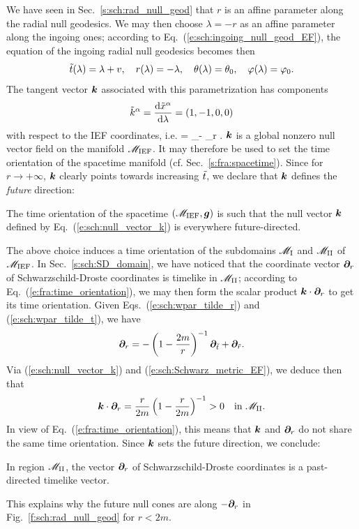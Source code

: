 We have seen in Sec.~\ref{s:sch:rad_null_geod} that $r$ is an affine parameter
along the radial null geodesics. We may then choose $\lambda=-r$ as an
affine parameter along the ingoing ones; according to
Eq.~(\ref{e:sch:ingoing_null_geod_EF}), the equation of the ingoing radial null geodesics
becomes then
\[
    {\tilde t}(\lambda) = \lambda + v, \quad r(\lambda) = - \lambda, \quad
    \theta(\lambda) = \theta_0,\quad \varphi(\lambda) = \varphi_0 .
\]
The tangent vector $\bm{k}$ associated with this parametrization has components
\[
    {\tilde k}^\alpha = \frac{\mathrm{d} {\tilde x}^\alpha}{\mathrm{d} \lambda}
        = (1, -1, 0, 0)
\]
with respect to the IEF coordinates, i.e.
\be \label{e:sch:null_vector_k}
     = \wpar_\ti - \wpar_{\tilde r} .
\ee
$\bm{k}$ is a global nonzero null vector field on the manifold
$\mathscr{M}_{\rm IEF}$. It may therefore be used to set the time orientation of the spacetime manifold
(cf. Sec.~\ref{s:fra:spacetime}). Since for $r\rightarrow+\infty$, $\bm{k}$
clearly points towards increasing ${\tilde t}$, we declare that $\bm{k}$ defines
the \emph{future} direction:
\begin{greybox}
The time orientation of the spacetime $(\mathscr{M}_{\rm IEF}, \bm{g})$ is such
that the null vector $\bm{k}$ defined by Eq.~(\ref{e:sch:null_vector_k})
is everywhere future-directed.
\end{greybox}

The above choice induces a time orientation of the subdomains
$\mathscr{M}_{\rm I}$ and $\mathscr{M}_{\rm II}$ of $\mathscr{M}_{\rm IEF}$.
In Sec.~\ref{s:sch:SD_domain},
we have noticed that the coordinate vector
$\bm{\partial}_r$ of Schwarzschild-Droste coordinates is timelike in $\mathscr{M}_{\rm II}$;
according to Eq.~(\ref{e:fra:time_orientation}),
we may then form the scalar product $\bm{k}\cdot\bm{\partial}_r$ to get its time
orientation. Given
Eqs.~(\ref{e:sch:wpar_tilde_r}) and (\ref{e:sch:wpar_tilde_t}), we have
\[
    \bm{\partial}_r = - \left( 1 - \frac{2m}{r} \right) ^{-1} \bm{\partial}_{{\tilde t}}
        + \bm{\partial}_{\tilde r} .
\]
Via (\ref{e:sch:null_vector_k}) and (\ref{e:sch:Schwarz_metric_EF}), we deduce
then that
\[
    \bm{k}\cdot\bm{\partial}_r = \frac{r}{2m} \left( 1 - \frac{r}{2m} \right) ^{-1}
    > 0 \quad\mbox{in} \ \mathscr{M}_{\rm II} .
\]
In view of Eq.~(\ref{e:fra:time_orientation}), this means that
$\bm{k}$ and $\bm{\partial}_r$ do not share the same time orientation.
Since $\bm{k}$ sets the future direction, we conclude:
\begin{greybox}
In region $\mathscr{M}_{\rm II}$, the vector $\bm{\partial}_r$ of Schwarzschild-Droste coordinates
is a past-directed timelike vector.
\end{greybox}
This explains why the future null cones are along $-\bm{\partial}_r$
in Fig.~\ref{f:sch:rad_null_geod} for $r<2m$.

